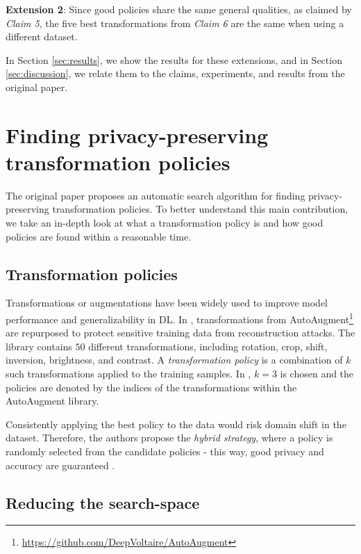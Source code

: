 \textbf{Extension 2}: Since good policies share the same general qualities, as claimed by \emph{Claim 5}, the five best transformations from \emph{Claim 6} are the same when using a different dataset.

In Section \ref{sec:results}, we show the results for these extensions, and in Section \ref{sec:discussion}, we relate them to the claims, experiments, and results from the original paper.



\section{Finding privacy-preserving transformation policies}

The original paper proposes an automatic search algorithm for finding privacy-preserving transformation policies. To better understand this main contribution, we take an in-depth look at what a transformation policy is and how good policies are found within a reasonable time.

\subsection{Transformation policies}

Transformations or augmentations have been widely used to improve model performance and generalizability in DL. In \cite{gao2021privacy}, transformations from AutoAugment\footnote{\url{https://github.com/DeepVoltaire/AutoAugment}} \cite{cubuk2019autoaugment} are repurposed to protect sensitive training data from reconstruction attacks. The library contains $50$ different transformations, including rotation, crop, shift, inversion, brightness, and contrast. A \emph{transformation policy} is a combination of $k$ such transformations applied to the training samples. In \cite{gao2021privacy}, $k=3$ is chosen and the policies are denoted by the indices of the transformations within the AutoAugment library.

Consistently applying the best policy to the data would risk domain shift in the dataset. Therefore, the authors propose the \emph{hybrid strategy}, where a policy is randomly selected from the candidate policies - this way, good privacy and accuracy are guaranteed \cite{gao2021privacy}.

\subsection{Reducing the search-space}
\label{sec:3.2search}

